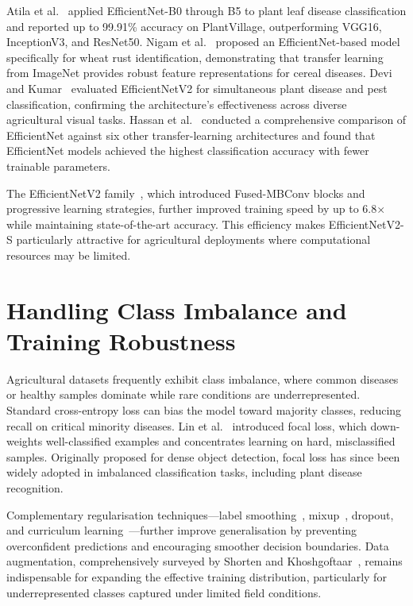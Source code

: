 \documentclass[12pt,a4paper]{report}
\begin{document}
Atila et al.~\cite{b4} applied EfficientNet-B0 through B5 to plant leaf disease classification and reported up to 99.91\% accuracy on PlantVillage, outperforming VGG16, InceptionV3, and ResNet50. Nigam et al.~\cite{b12} proposed an EfficientNet-based model specifically for wheat rust identification, demonstrating that transfer learning from ImageNet provides robust feature representations for cereal diseases. Devi and Kumar~\cite{b13} evaluated EfficientNetV2 for simultaneous plant disease and pest classification, confirming the architecture's effectiveness across diverse agricultural visual tasks. Hassan et al.~\cite{b14} conducted a comprehensive comparison of EfficientNet against six other transfer-learning architectures and found that EfficientNet models achieved the highest classification accuracy with fewer trainable parameters.

The EfficientNetV2 family~\cite{b1}, which introduced Fused-MBConv blocks and progressive learning strategies, further improved training speed by up to 6.8$\times$ while maintaining state-of-the-art accuracy. This efficiency makes EfficientNetV2-S particularly attractive for agricultural deployments where computational resources may be limited.

\section{Handling Class Imbalance and Training Robustness}
Agricultural datasets frequently exhibit class imbalance, where common diseases or healthy samples dominate while rare conditions are underrepresented. Standard cross-entropy loss can bias the model toward majority classes, reducing recall on critical minority diseases. Lin et al.~\cite{b2} introduced focal loss, which down-weights well-classified examples and concentrates learning on hard, misclassified samples. Originally proposed for dense object detection, focal loss has since been widely adopted in imbalanced classification tasks, including plant disease recognition.

Complementary regularisation techniques---label smoothing~\cite{b18}, mixup~\cite{b22}, dropout, and curriculum learning~\cite{b23}---further improve generalisation by preventing overconfident predictions and encouraging smoother decision boundaries. Data augmentation, comprehensively surveyed by Shorten and Khoshgoftaar~\cite{b17}, remains indispensable for expanding the effective training distribution, particularly for underrepresented classes captured under limited field conditions.
\end{document}
